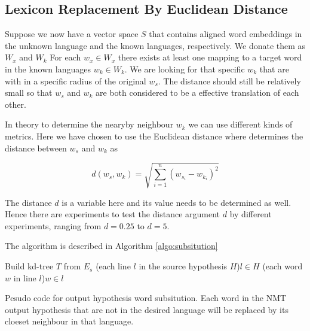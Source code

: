 \documentclass[thesis,fonts=libertine]{cluu}
\begin{document}
\subsection{Lexicon Replacement By Euclidean Distance}

Suppose we now have a vector space $S$ that contains aligned word embeddings in the unknown language and the known languages, respectively. We donate them as $W_x$ and $W_k$ For each $w_x\in W_x$ there exists at least one mapping to a target word in the known languages $w_k \in W_k$. We are looking for that specific $w_k$ that are with in a specific radius of the original $w_s$. The distance should still be relatively small so that $w_s$ and $w_k$ are both considered to be a effective translation of each other.

In theory to determine the nearyby neighbour $w_k$ we can use different kinds of metrics. Here we have chosen to use the Euclidean distance where determines the distance between $w_s$ and $w_k$ as

\begin{equation}
  d(w_s, w_k)=\sqrt{\sum_{i=1}^n{(w_{s_i}-w_{k_i})}^2}
\end{equation}

The distance $d$ is a variable here and its value needs to be determined as well. Hence there are experiments to test the distance argument $d$ by different experiments, ranging from $d=0.25$ to $d=5$.

The algorithm is described in Algorithm \ref{algo:subsitution}

\begin{algorithm}[H]
  \SetAlgoLined

  Build kd-tree $T$ from $E_s$
  \For(each line $l$ in the source hypothesis $H$){$l \in H$}{
    \For(each word $w$ in line $l$){$w \in l$}{
    }
  }
  \caption{Pesudo code for output hypothesis word subsitution. Each word in the NMT output hypothesis that are not in the desired language will be replaced by its cloeset neighbour in that language.}
  \label{algo:subsitution}
\end{algorithm}
\end{document}
